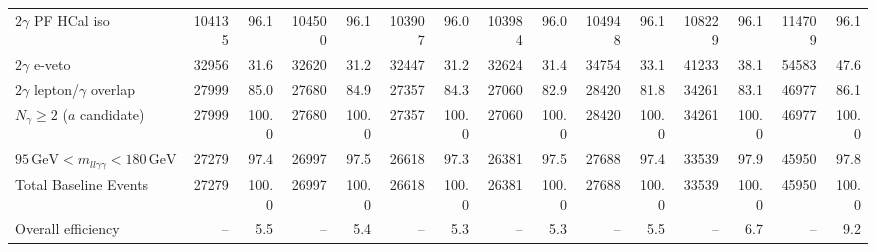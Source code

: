 \begin{table}[htbp]
{\begin{tabular}{lrrrrrrrrrrrrrr}
$2\gamma$ PF HCal iso & 104135 & 96.1 & 104500 & 96.1 & 103907 & 96.0 & 103984 & 96.0 & 104948 & 96.1 & 108229 & 96.1 & 114709 & 96.1 \\
$2\gamma$ e-veto & 32956 & 31.6 & 32620 & 31.2 & 32447 & 31.2 & 32624 & 31.4 & 34754 & 33.1 & 41233 & 38.1 & 54583 & 47.6 \\
$2\gamma$ lepton/$\gamma$ overlap & 27999 & 85.0 & 27680 & 84.9 & 27357 & 84.3 & 27060 & 82.9 & 28420 & 81.8 & 34261 & 83.1 & 46977 & 86.1 \\
$N_{\gamma}\geq 2$ ($a$ candidate) & 27999 & 100.0 & 27680 & 100.0 & 27357 & 100.0 & 27060 & 100.0 & 28420 & 100.0 & 34261 & 100.0 & 46977 & 100.0 \\
$95\,\mathrm{GeV} < m_{ll\gamma\gamma} < 180\,\mathrm{GeV}$ & 27279 & 97.4 & 26997 & 97.5 & 26618 & 97.3 & 26381 & 97.5 & 27688 & 97.4 & 33539 & 97.9 & 45950 & 97.8 \\
Total Baseline Events & 27279 & 100.0 & 26997 & 100.0 & 26618 & 100.0 & 26381 & 100.0 & 27688 & 100.0 & 33539 & 100.0 & 45950 & 100.0 \\
\hline
Overall efficiency & -- & 5.5 & -- & 5.4 & -- & 5.3 & -- & 5.3 & -- & 5.5 & -- & 6.7 & -- & 9.2 \\
\hline
\end{tabular}%
}
\end{table}

